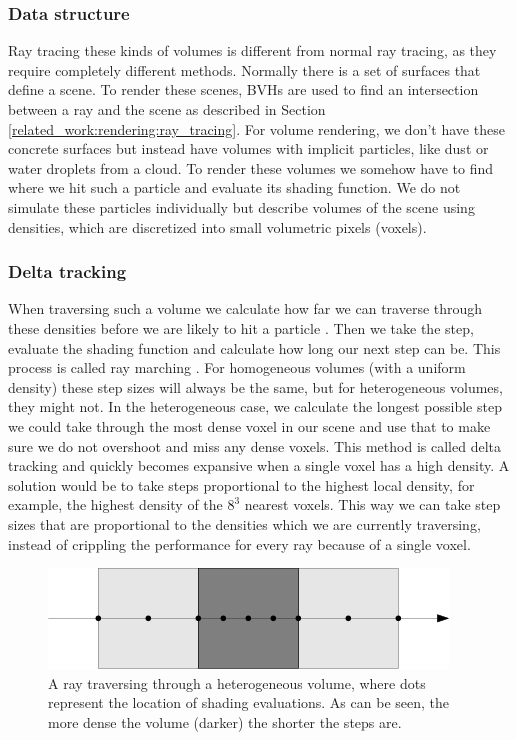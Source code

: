 \subsubsection{Data structure} \label{related_work:path_traced_volume_rendering:data_structure}
Ray tracing these kinds of volumes is different from normal ray tracing, as they require completely different methods. Normally there is a set of surfaces that define a scene. To render these scenes, BVHs are used to find an intersection between a ray and the scene as described in Section \ref{related_work:rendering:ray_tracing}. For volume rendering, we don't have these concrete surfaces but instead have volumes with implicit particles, like dust or water droplets from a cloud. To render these volumes we somehow have to find where we hit such a particle and evaluate its shading function. We do not simulate these particles individually but describe volumes of the scene using densities, which are discretized into small volumetric pixels (voxels).

\subsubsection{Delta tracking} \label{related_work:path_traced_volume_rendering:delta_tracking}
When traversing such a volume we calculate how far we can traverse through these densities before we are likely to hit a particle \cite{kajiya1984ray}. Then we take the step, evaluate the shading function and calculate how long our next step can be. This process is called ray marching \cite{RenderingWithTwoTriangles}. For homogeneous volumes (with a uniform density) these step sizes will always be the same, but for heterogeneous volumes, they might not. In the heterogeneous case, we calculate the longest possible step we could take through the most dense voxel in our scene and use that to make sure we do not overshoot and miss any dense voxels. This method is called delta tracking \cite{kutz2017spectral} and quickly becomes expansive when a single voxel has a high density. A solution would be to take steps proportional to the highest local density, for example, the highest density of the $8^3$ nearest voxels. This way we can take step sizes that are proportional to the densities which we are currently traversing, instead of crippling the performance for every ray because of a single voxel.

\begin{figure}[H]
    \centering
    \includegraphics[width=0.9\linewidth]{figures/sample_step_size.png}
    \caption{A ray traversing through a heterogeneous volume, where dots represent the location of shading evaluations. As can be seen, the more dense the volume (darker) the shorter the steps are.}
    \label{fig:sample_step_size}
\end{figure}

